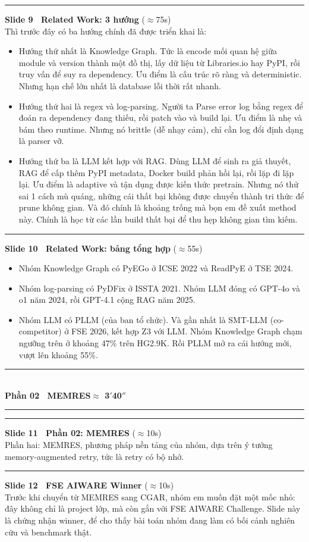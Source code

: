 \documentclass[11pt]{article}
\newcommand{\parthead}[2]{%
  \vspace{1.4em}\par
  {\noindent\color{navydeep}\rule{\linewidth}{1.4pt}}\\[0.35em]
  {\bfseries\Large\color{navydeep}#1}\hfill{\normalsize\color{accent}\bfseries #2}\\[-0.35em]
  {\noindent\color{navydeep}\rule{\linewidth}{1.4pt}}
  \par\vspace{0.6em}%
}
\newcommand{\slidehead}[3]{%
  \vspace{1.05em}\par\noindent
  {\color{accent}\rule[-0.18em]{3pt}{1.05em}}\hspace{0.5em}%
  {\bfseries\large\color{navydeep}Slide #1 \textperiodcentered\ #2}%
  \hfill{\small\color{gray}(#3)}\\[0.25em]%
}
\begin{document}
\slidehead{9}{Related Work: 3 hướng}{$\approx$75s}
Thì trước đây có ba hướng chính đã được triển khai là:
\begin{itemize}
  \item Hướng thứ nhất là Knowledge Graph. Tức là encode mối quan hệ giữa module và version thành một đồ thị, lấy dữ liệu từ Libraries.io hay PyPI, rồi truy vấn để suy ra dependency. Ưu điểm là cấu trúc rõ ràng và deterministic. Nhưng hạn chế lớn nhất là database lỗi thời rất nhanh.
  \item Hướng thứ hai là regex và log-parsing. Người ta Parse error log bằng regex để đoán ra dependency đang thiếu, rồi patch vào và build lại. Ưu điểm là nhẹ và bám theo runtime. Nhưng nó brittle (dễ nhạy cảm), chỉ cần log đổi định dạng là parser vỡ.
  \item Hướng thứ ba là LLM kết hợp với RAG. Dùng LLM để sinh ra giả thuyết, RAG để cấp thêm PyPI metadata, Docker build phản hồi lại, rồi lặp đi lặp lại. Ưu điểm là adaptive và tận dụng được kiến thức pretrain. Nhưng nó thử sai 1 cách mù quáng, những cái thất bại không được chuyển thành tri thức để prune không gian. Và đó chính là khoảng trống mà bọn em đề xuất method này. Chính là học từ các lần build thất bại để thu hẹp không gian tìm kiếm.
\end{itemize}

\slidehead{10}{Related Work: bảng tổng hợp}{$\approx$55s}
\begin{itemize}
  \item Nhóm Knowledge Graph có PyEGo ở ICSE 2022 và ReadPyE ở TSE 2024.
  \item Nhóm log-parsing có PyDFix ở ISSTA 2021. Nhóm LLM đóng có GPT-4o và o1 năm 2024, rồi GPT-4.1 cộng RAG năm 2025.
  \item Nhóm LLM có PLLM (của ban tổ chức). Và gần nhất là SMT-LLM (co-competitor) ở FSE 2026, kết hợp Z3 với LLM. Nhóm Knowledge Graph chạm ngưỡng trên ở khoảng 47\% trên HG2.9K. Rồi PLLM mở ra cái hướng mới, vượt lên khoảng 55\%.
\end{itemize}

\parthead{Phần 02 \textperiodcentered\ MEMRES}{$\approx$ 3$'$40$''$}

\slidehead{11}{Phần 02: MEMRES}{$\approx$10s}
Phần hai: MEMRES, phương pháp nền tảng của nhóm, dựa trên ý tưởng memory-augmented retry, tức là retry có bộ nhớ.

\slidehead{12}{FSE AIWARE Winner}{$\approx$10s}
Trước khi chuyển từ MEMRES sang CGAR, nhóm em muốn đặt một mốc nhỏ: đây không chỉ là project lớp, mà còn gắn với FSE AIWARE Challenge. Slide này là chứng nhận winner, để cho thấy bài toán nhóm đang làm có bối cảnh nghiên cứu và benchmark thật.
\end{document}
